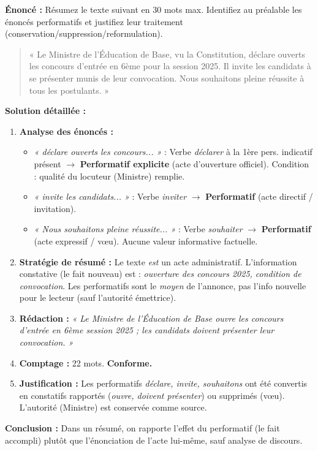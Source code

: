 \documentclass[11pt]{article}
\begin{document}
\begin{exoresolu}
\textbf{Énoncé :} Résumez le texte suivant en 30 mots max. Identifiez au préalable les énoncés performatifs et justifiez leur traitement (conservation/suppression/reformulation).
\begin{quote}
« Le Ministre de l'Éducation de Base, vu la Constitution, déclare ouverts les concours d'entrée en 6ème pour la session 2025. Il invite les candidats à se présenter munis de leur convocation. Nous souhaitons pleine réussite à tous les postulants. »
\end{quote}
\tcblower
\textbf{Solution détaillée :}
\begin{enumerate}
    \item \textbf{Analyse des énoncés :}
    \begin{itemize}
        \item \emph{« déclare ouverts les concours... »} : Verbe \emph{déclarer} à la 1ère pers. indicatif présent $\rightarrow$ \textbf{Performatif explicite} (acte d'ouverture officiel). Condition : qualité du locuteur (Ministre) remplie.
        \item \emph{« invite les candidats... »} : Verbe \emph{inviter} $\rightarrow$ \textbf{Performatif} (acte directif / invitation).
        \item \emph{« Nous souhaitons pleine réussite... »} : Verbe \emph{souhaiter} $\rightarrow$ \textbf{Performatif} (acte expressif / vœu). Aucune valeur informative factuelle.
    \end{itemize}
    \item \textbf{Stratégie de résumé :} Le texte \emph{est} un acte administratif. L'information constative (le fait nouveau) est : \emph{ouverture des concours 2025, condition de convocation}. Les performatifs sont le \emph{moyen} de l'annonce, pas l'info nouvelle pour le lecteur (sauf l'autorité émettrice).
    \item \textbf{Rédaction :}
    \emph{« Le Ministre de l'Éducation de Base ouvre les concours d'entrée en 6ème session 2025 ; les candidats doivent présenter leur convocation. »}
    \item \textbf{Comptage :} 22 mots. \textbf{Conforme.}
    \item \textbf{Justification :} Les performatifs \emph{déclare, invite, souhaitons} ont été convertis en constatifs rapportés (\emph{ouvre, doivent présenter}) ou supprimés (vœu). L'autorité (Ministre) est conservée comme source.
\end{enumerate}
\textbf{Conclusion :} Dans un résumé, on rapporte l'effet du performatif (le fait accompli) plutôt que l'énonciation de l'acte lui-même, sauf analyse de discours.
\end{exoresolu}
\end{document}
